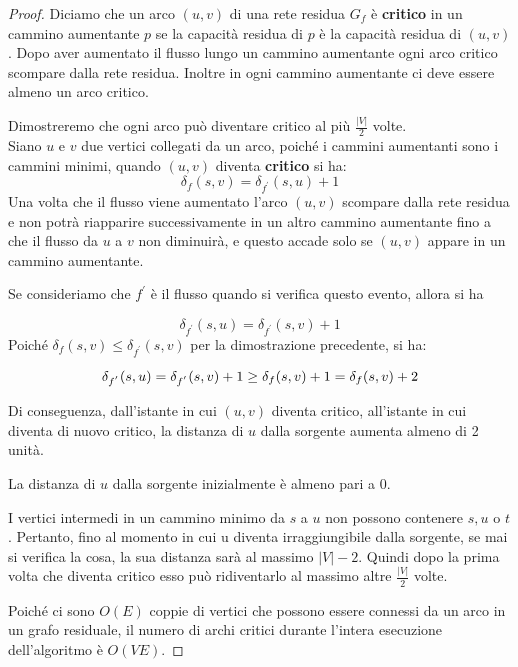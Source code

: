 \begin{proof}
  Diciamo che un arco $(u,v)$ di una rete residua $G_f$ è \textbf{critico} in un
  cammino aumentante $p$ se la capacità residua di $p$ è la capacità residua di
  $(u,v)$. Dopo aver aumentato il flusso lungo un cammino aumentante ogni arco
  critico scompare dalla rete residua. Inoltre in ogni cammino aumentante ci deve
  essere almeno un arco critico.

  Dimostreremo che ogni arco può diventare critico al più $\frac{|V|}{2}$ volte.\\

  Siano $u$ e $v$ due vertici collegati da un arco, poiché i cammini aumentanti
  sono i cammini minimi, quando $(u,v)$ diventa \textbf{critico} si ha:
  $$
    \delta_f(s,v) = \delta_{f^{'}}(s,u) +1
  $$
  Una volta che il flusso viene aumentato l'arco $(u,v)$ scompare dalla rete
  residua e non potrà riapparire successivamente in un altro cammino aumentante
  fino a che il flusso da $u$ a $v$ non diminuirà, e questo accade solo se $(u,v)$
  appare in un cammino aumentante.

  Se consideriamo che $f^{'}$ è il flusso quando si verifica questo evento, allora
  si ha

  $$
    \delta_{f^{'}}(s,u) = \delta_{f^{'}}(s,v) +1
  $$
  Poiché $\delta_f(s,v) \le \delta_{f^{'}}(s,v)$ per la dimostrazione precedente,
  si ha:

  $$
    \delta_{f^{'}}(s,u) =  \delta_{f^{'}}(s,v) + 1 \\
    \ge \delta_f(s,v) + 1
    = \delta_f(s,v) +2
  $$


  Di conseguenza, dall'istante in cui $(u,v)$ diventa critico, all'istante in cui
  diventa di nuovo critico, la distanza di $u$ dalla sorgente aumenta almeno di 2
  unità.

  La distanza di $u$ dalla sorgente inizialmente è almeno pari a 0.

  I vertici intermedi in un cammino minimo da $s$ a $u$ non possono contenere $s,
    u$ o $t$. Pertanto, fino al momento in cui u diventa irraggiungibile dalla
  sorgente, se mai si verifica la cosa, la sua distanza sarà al massimo $|V| -2$.
  Quindi dopo la prima volta che diventa critico esso può ridiventarlo al massimo
  altre $\frac{|V|}{2}$ volte.

  Poiché ci sono $O(E)$ coppie di vertici che possono essere connessi da un arco
  in un grafo residuale, il numero di archi critici durante l'intera esecuzione
  dell'algoritmo è  $O(VE)$.
\end{proof}

